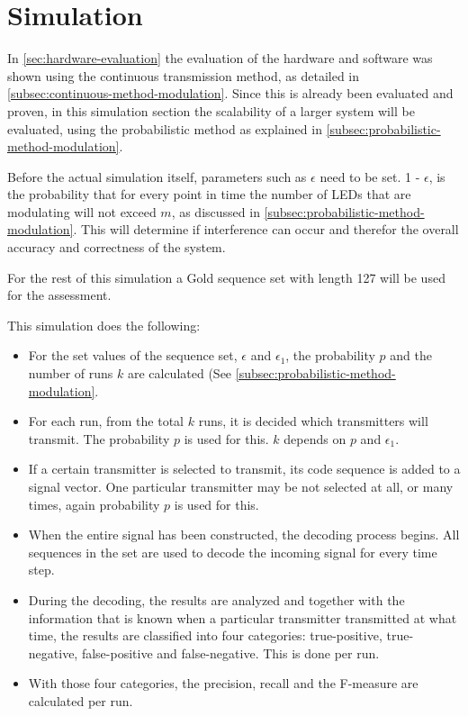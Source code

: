 
\section{Simulation}
\label{sec:simulation-evaluation}

In \autoref{sec:hardware-evaluation} the evaluation of the hardware and software was shown using the continuous transmission method, as detailed in \autoref{subsec:continuous-method-modulation}.
Since this is already been evaluated and proven, in this simulation section the scalability of a larger system will be evaluated, using the probabilistic method as explained in \autoref{subsec:probabilistic-method-modulation}.


Before the actual simulation itself, parameters such as $\epsilon$ need to be set.
1 - $\epsilon$, is the probability that for every point in time the number of LEDs that are modulating will not exceed $m$, as discussed in \autoref{subsec:probabilistic-method-modulation}.
This will determine if interference can occur and therefor the overall accuracy and correctness of the system.

For the rest of this simulation a Gold sequence set with length 127 will be used for the assessment.

This simulation does the following: 

\begin{itemize}

	\item For the set values of the sequence set, $\epsilon$ and $\epsilon_1$, the probability $p$ and the number of runs $k$ are calculated (See \autoref{subsec:probabilistic-method-modulation}.

	\item For each run, from the total $k$ runs, it is decided which transmitters will transmit. The probability $p$ is used for this. $k$ depends on $p$ and $\epsilon_1$.

	\item If a certain transmitter is selected to transmit, its code sequence is added to a signal vector. One particular transmitter may be not selected at all, or many times, again probability $p$ is used for this.

	\item When the entire signal has been constructed, the decoding process begins. All sequences in the set are used to decode the incoming signal for every time step.

	\item During the decoding, the results are analyzed and together with the information that is known when a particular transmitter transmitted at what time, the results are classified into four categories: true-positive, true-negative, false-positive and false-negative. This is done per run.

	\item With those four categories, the precision, recall and the F-measure are calculated per run.



\end{itemize}




